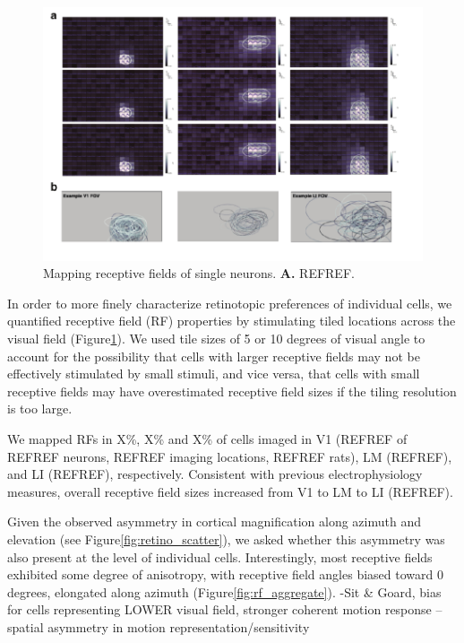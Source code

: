 \begin{figure}[t!]
    \includegraphics[width=\textwidth]{figures/chapter_3/rf_examples/rf_examples.pdf}
    \vspace{.1in}
    \caption[Receptive field mapping]{Mapping receptive fields of single neurons. \textbf{A.} REFREF.
    \label{fig:rf_examples}}
\end{figure}

In order to more finely characterize retinotopic preferences of individual cells, we quantified receptive field (RF) properties by stimulating tiled locations across the visual field (Figure\ref{fig:rf_examples}). We used tile sizes of 5 or 10 degrees of visual angle to account for the possibility that cells with larger receptive fields may not be effectively stimulated by small stimuli, and vice versa, that  cells with small receptive fields may have overestimated receptive field sizes if the tiling resolution is too large.

We mapped RFs in X\%, X\% and X\% of cells imaged in V1 (REFREF of REFREF neurons, REFREF imaging locations, REFREF rats), LM (REFREF), and LI (REFREF), respectively. Consistent with previous electrophysiology measures\cite{Vermaercke2014, Tafazoli2017}, overall receptive field sizes increased from V1 to LM to LI (REFREF).

Given the observed asymmetry in cortical magnification along azimuth and elevation (see Figure\ref{fig:retino_scatter}), we asked whether this asymmetry was also present at the level of individual cells. Interestingly, most receptive fields exhibited some degree of anisotropy, with receptive field angles biased toward 0 degrees, elongated along azimuth (Figure\ref{fig:rf_aggregate}). 
-Sit & Goard, bias for cells representing LOWER visual field, stronger coherent motion response -- spatial asymmetry in motion representation/sensitivity

